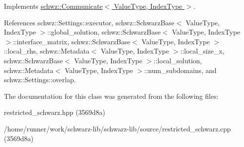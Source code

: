 Implements \hyperlink{classschwz_1_1Communicate_aa1332376dfc67f5384527be90df7cbea}{schwz\+::\+Communicate$<$ Value\+Type, Index\+Type $>$}.



References schwz\+::\+Settings\+::executor, schwz\+::\+Schwarz\+Base$<$ Value\+Type, Index\+Type $>$\+::global\+\_\+solution, schwz\+::\+Schwarz\+Base$<$ Value\+Type, Index\+Type $>$\+::interface\+\_\+matrix, schwz\+::\+Schwarz\+Base$<$ Value\+Type, Index\+Type $>$\+::local\+\_\+rhs, schwz\+::\+Metadata$<$ Value\+Type, Index\+Type $>$\+::local\+\_\+size\+\_\+x, schwz\+::\+Schwarz\+Base$<$ Value\+Type, Index\+Type $>$\+::local\+\_\+solution, schwz\+::\+Metadata$<$ Value\+Type, Index\+Type $>$\+::num\+\_\+subdomains, and schwz\+::\+Settings\+::overlap.



The documentation for this class was generated from the following files\+:\begin{DoxyCompactItemize}
\item 
restricted\+\_\+schwarz.\+hpp (3569d8a)\item 
/home/runner/work/schwarz-\/lib/schwarz-\/lib/source/restricted\+\_\+schwarz.\+cpp (3569d8a)\end{DoxyCompactItemize}
